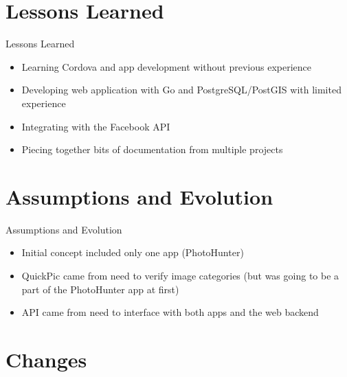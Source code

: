 \documentclass[aspectratio=169]{beamer}
\begin{document}
\section{Lessons Learned}

\begin{frame}{Lessons Learned}
	\begin{itemize}

		\item Learning Cordova and app development without previous experience

    \item Developing web application with Go and PostgreSQL/PostGIS with limited experience

		\item Integrating with the Facebook API

		\item Piecing together bits of documentation from multiple projects

	\end{itemize}
\end{frame}

\section{Assumptions and Evolution}

\begin{frame}{Assumptions and Evolution}
	\begin{itemize}

		\item Initial concept included only one app (PhotoHunter)

		\item QuickPic came from need to verify image categories (but was going to
					be a part of the PhotoHunter app at first)

		\item API came from need to interface with both apps and the web backend

	\end{itemize}
\end{frame}

\section{Changes}
\end{document}
